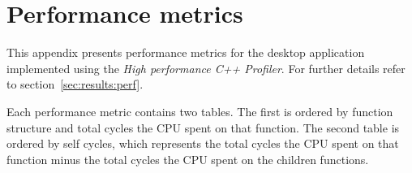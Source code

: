 \chapter{Performance metrics} \label{appx:perf}

This appendix presents performance metrics for the desktop application
implemented using the \emph{High performance C++ Profiler}. For further
details refer to section~\ref{sec:results:perf}.

Each performance metric contains two tables. The first is ordered by
function structure and total cycles the CPU spent on that function. The second
table is ordered by self cycles, which represents the total cycles the CPU spent
on that function minus the total cycles the CPU spent on the children functions.








